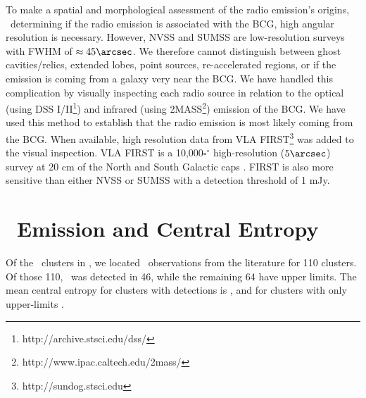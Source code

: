 \documentclass[12pt,preprint]{aastex}
\begin{document}
To make a spatial and morphological assessment of the radio emission's
origins, \ie\ determining if the radio emission is associated with the
BCG, high angular resolution is necessary. However, NVSS and SUMSS are
low-resolution surveys with FWHM of $\approx 45\arcsec$. We therefore
cannot distinguish between ghost cavities/relics, extended lobes,
point sources, re-accelerated regions, or if the emission is coming
from a galaxy very near the BCG. We have handled this complication by
visually inspecting each radio source in relation to the optical
(using DSS I/II\footnote{http://archive.stsci.edu/dss/}) and infrared
(using 2MASS\footnote{http://www.ipac.caltech.edu/2mass/}) emission of
the BCG. We have used this method to establish that the radio emission
is most likely coming from the BCG. When available, high resolution
data from VLA FIRST\footnote{http://sundog.stsci.edu} was added to the
visual inspection. VLA FIRST is a 10,000$\square^\circ$
high-resolution ($5\arcsec$) survey at 20 cm of the North and South
Galactic caps \citep{first}. FIRST is also more sensitive than either
NVSS or SUMSS with a detection threshold of 1 mJy.

\section{\halpha\ Emission and Central Entropy}
\label{sec:sf}

Of the \clnum\ clusters in \accept, we located \halpha\ observations
from the literature for 110 clusters. Of those 110, \halpha\ was
detected in 46, while the remaining 64 have upper limits. The mean
central entropy for clusters with detections is \fha, and for clusters
with only upper-limits \nfha.
\end{document}
